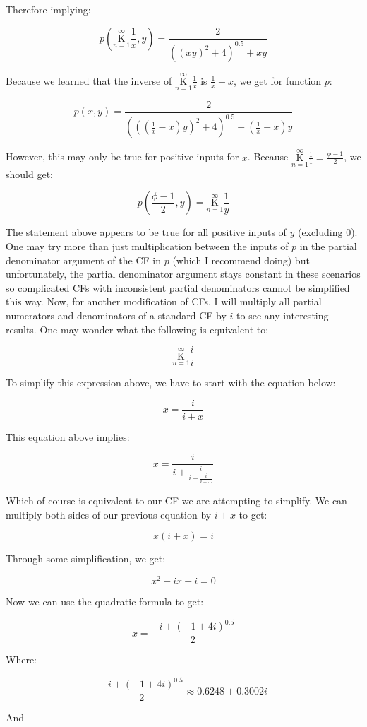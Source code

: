 \documentclass{article}
\begin{document}
Therefore implying:

$$p(\underset{n=1}{\overset{\infty}{ \mathrm K}} \frac{1}{x},y)=\frac{2}{((xy)^2+4)^{0.5}+xy}$$

Because we learned that the inverse of $\underset{n=1}{\overset{\infty}{ \mathrm K}} \frac{1}{x}$ is $\frac{1}{x}-x$, we get for function $p$:

$$p(x,y)=\frac{2}{(((\frac{1}{x}-x)y)^2+4)^{0.5}+(\frac{1}{x}-x)y}$$

However, this may only be true for positive inputs for $x$. Because $\underset{n=1}{\overset{\infty}{ \mathrm K}} \frac{1}{1}=\frac{\phi-1}{2}$, we should get:

$$p(\frac{\phi-1}{2},y)=\underset{n=1}{\overset{\infty}{ \mathrm K}} \frac{1}{y}$$

The statement above appears to be true for all positive inputs of $y$ (excluding 0). One may try more than just multiplication between the inputs of $p$ in the partial denominator argument of the CF in $p$ (which I recommend doing) but unfortunately, the partial denominator argument stays constant in these scenarios so complicated CFs with inconsistent partial denominators cannot be simplified this way. Now, for another modification of CFs, I will multiply all partial numerators and denominators of a standard CF by $i$ to see any interesting results. One may wonder what the following is equivalent to:

$$\underset{n=1}{\overset{\infty}{ \mathrm K}} \frac{i}{i}$$

To simplify this expression above, we have to start with the equation below:

$$x=\frac{i}{i+x}$$

This equation above implies:

$$x=\frac{i}{i
+\frac{i}{i+\frac{i}{i+\cdots}}}$$

Which of course is equivalent to our CF we are attempting to simplify. We can multiply both sides of our previous equation by $i+x$ to get:

$$x(i+x)=i$$

Through some simplification, we get:

$$x^2+ix-i=0$$

Now we can use the quadratic formula to get:

$$x=\frac{-i \pm (-1+4i)^{0.5}}{2}$$

Where:

$$\frac{-i + (-1+4i)^{0.5}}{2} \approx 0.6248 + 0.3002i$$

And
\end{document}
